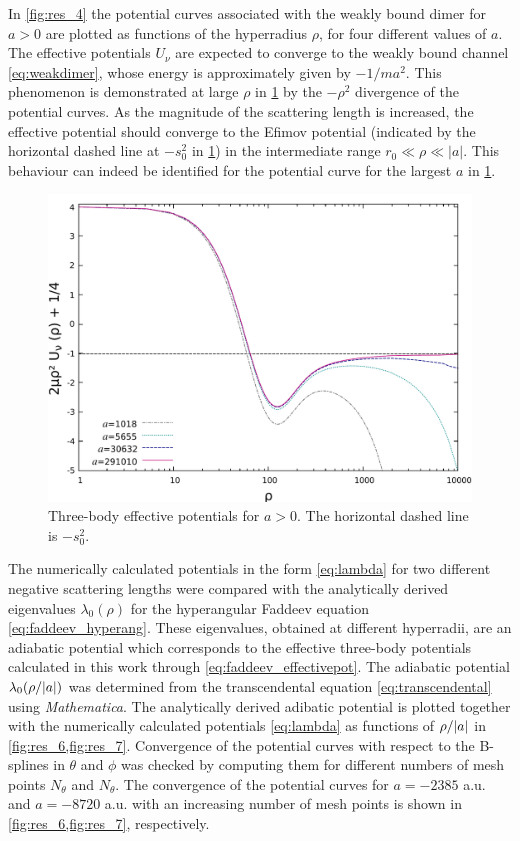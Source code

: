 In \cref{fig:res_4} the potential curves associated with the weakly bound dimer for $a>0$ are plotted as functions of the hyperradius $\rho$, for four different values of $a$. The effective potentials $U_{\nu}$ are expected to converge to the weakly bound channel \eqref{eq:weakdimer}, whose energy is approximately given by $-1/ma^2$. This phenomenon is demonstrated at
large $\rho$ in \cref{fig:res_5} by the $-\rho^2$ divergence of the potential curves. As the magnitude of the scattering length is increased, the effective potential should converge to the Efimov potential (indicated by the horizontal dashed line at $-s_0^2$ in  \cref{fig:res_5}) in the intermediate range $r_0 \ll \rho \ll |a|$. This behaviour can indeed be identified for the potential curve for the largest $a$ in \cref{fig:res_5}.

\begin{figure}
	\includegraphics[width=\linewidth]{plotpos.pdf}
	\caption{Three-body effective potentials for $a>0$. The horizontal dashed line is $-s_0^2$.}
	\label{fig:res_5}
\end{figure}

The numerically calculated potentials in the form \eqref{eq:lambda} for two different negative scattering lengths were compared with the analytically derived eigenvalues $\lambda_0(\rho)$ for the hyperangular Faddeev equation \eqref{eq:faddeev_hyperang}. These eigenvalues, obtained at different hyperradii, are an adiabatic potential which corresponds to the effective three-body potentials calculated in this work through \eqref{eq:faddeev_effectivepot}. The adiabatic potential $\lambda_0(\rho/\lvert a\rvert)$ was determined from the transcendental equation \eqref{eq:transcendental} using \textit{Mathematica}. The analytically derived adibatic potential is plotted together with the numerically calculated potentials \eqref{eq:lambda} as functions of $\rho/\lvert a\rvert$ in \cref{fig:res_6,fig:res_7}. Convergence of the potential curves with respect to the B-splines in $\theta$ and $\phi$ was checked by computing them for different numbers of mesh points $N_{\theta}$ and $N_{\theta}$. The convergence of the potential curves for $a=-2385$ a.u. and $a=-8720$ a.u. with an increasing number of mesh points is shown in \cref{fig:res_6,fig:res_7}, respectively. 

